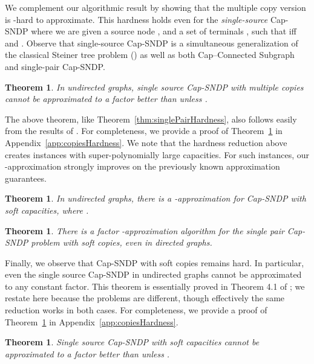 \documentclass[11pt]{article}
\newcounter{thm0Rcopies}
\newcounter{thm_saved}
\newtheorem{theorem}[lemma]{Theorem}
\def\capR{Cap--Connected Subgraph\xspace}
\begin{document}
We complement our algorithmic result by showing that the multiple copy
version is -hard to approximate.  This hardness
holds even for the {\em single-source} Cap-SNDP where we are given a
source node , and a set of terminals , such that
 iff  and .  Observe that single-source
Cap-SNDP is a simultaneous generalization of the classical Steiner
tree problem () as well as both \capR and
single-pair Cap-SNDP.

\begin{theorem}\label{thm:copiesHardness}
  In undirected graphs, single source Cap-SNDP with multiple copies
  cannot be approximated to a factor better than 
  unless .
\end{theorem}

The above theorem, like Theorem~\ref{thm:singlePairHardness}, also
follows easily from the results of \cite{CGNS}.  For completeness, we
provide a proof of Theorem~\ref{thm:copiesHardness} in
Appendix~\ref{app:copiesHardness}. We note that the hardness reduction 
above creates instances with super-polynomially
large capacities. For such instances, our -approximation
strongly improves on the previously known approximation guarantees.



\iffalse
\begin{theorem}\label{thm:Rmax}
  In undirected graphs, there is a -approximation for
  Cap-SNDP with soft capacities, where .
\end{theorem}

\begin{theorem}\label{thm:singlesoft}
  There is a factor -approximation algorithm for the single pair
  Cap-SNDP problem with soft copies, even in directed graphs.
\end{theorem}

  Finally, we observe that Cap-SNDP with soft copies remains hard. In
  particular, even the single source Cap-SNDP in undirected graphs
  cannot be approximated to any constant factor.  This theorem is
  essentially proved in Theorem 4.1 of \cite{CGNS}; we restate here
  because the problems are different, though effectively the same
  reduction works in both cases.  For completeness, we provide a proof
  of Theorem~\ref{thm:copiesHardness} in
  Appendix~\ref{app:copiesHardness}.

\begin{theorem}\label{thm:copiesHardness}
  Single source Cap-SNDP with soft capacities cannot be approximated
  to a factor better than  unless .
\end{theorem}
\end{document}
